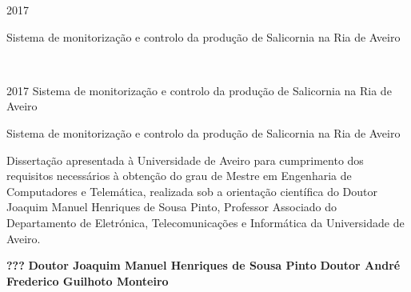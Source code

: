 \documentclass[11pt,twoside,a4paper]{report}
\def\ThesisYear{2017}
\newcommand{\namethesispt}{Sistema de monitorização e controlo da produção de Salicornia na Ria de Aveiro}
\newcommand{\namethesisen}{}
\begin{document}
%
%

\TitlePage
         {\ThesisYear}
        {\namethesispt
        \newline \newline
       	\namethesisen
    	}
\EndTitlePage
\titlepage\ \endtitlepage %

\TitlePage
  \HEADER{\BAR\FIG{\begin{minipage}{50mm} %
          \end{minipage}}}
         {\ThesisYear}
{\namethesispt
\newline \newline
\namethesisen}
\EndTitlePage
\titlepage\ \endtitlepage %


%
%

\TitlePage
  \HEADERSEM{}{\ThesisYear}
  {\namethesispt
  	\newline \newline
  	\namethesisen
  }
  \vspace*{15mm}
  \TEXT{}
       {Dissertação apresentada à Universidade de Aveiro para cumprimento dos requisitos necessários à obtenção do grau de Mestre em Engenharia de Computadores e Telemática, realizada sob a orientação científica do Doutor Joaquim Manuel Henriques de Sousa Pinto, Professor Associado do Departamento de Eletrónica, Telecomunicações e Informática da Universidade de Aveiro. }
\EndTitlePage
\titlepage\ \endtitlepage %

\TitlePage
  \vspace*{55mm}
       {}
       {\textbf{???}}
  \vspace*{5mm}
       {\textbf{Doutor Joaquim Manuel Henriques de Sousa Pinto}}
  \vspace*{5mm}
  \TEXT{}
       {\textbf{Doutor André Frederico Guilhoto Monteiro
       		}}
\EndTitlePage
\titlepage\ \endtitlepage %
\end{document}
